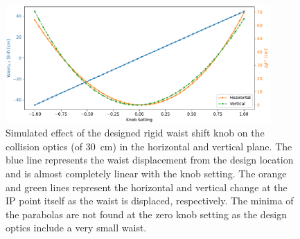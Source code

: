 \begin{figure}
    \centering
    \includegraphics[width=0.9\textwidth]{Figures/Chapter4/rigid_waist_shift_effect_combined.pdf}
    \caption{Simulated effect of the designed rigid waist shift knob on the collision optics (\betastar of \qty{30}{\centi\metre}) in the horizontal and vertical plane. The blue line represents the waist displacement from the design location and is almost completely linear with the knob setting. The orange and green lines represent the horizontal and vertical \betafunctions change at the IP point itself as the waist is displaced, respectively. The minima of the parabolas are not found at the zero knob setting as the design optics include a very small waist.}
    \label{figure:rigid_waist_shift_knob_effect}
\end{figure}


